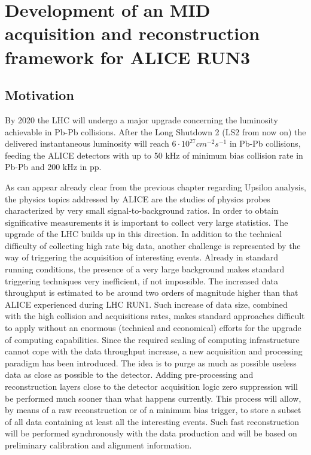 \chapter{Development of an MID acquisition and reconstruction framework for ALICE RUN3}

\section{Motivation}
By 2020 the LHC will undergo a major upgrade concerning the luminosity achievable in Pb-Pb collisions.
After the Long Shutdown 2 (LS2 from now on) the delivered instantaneous luminosity will reach $6\cdot10^{27} cm^{-2}s^{-1}$ in Pb-Pb collisions, feeding the ALICE detectors with up to 50 kHz of minimum bias collision rate in Pb-Pb and 200 kHz in pp.

As can appear already clear from the previous chapter regarding Upsilon analysis, the physics topics addressed by ALICE are the studies of physics probes characterized by very small signal-to-background ratios.
In order to obtain significative measurements it is important to collect very large statistics.
The upgrade of the LHC builds up in this direction.
In addition to the technical difficulty of collecting high rate big data, another challenge is represented by the way of triggering the acquisition of interesting events.
Already in standard running conditions, the presence of a very large background makes standard triggering techniques very inefficient, if not impossible.
The increased data throughput is estimated to be around two orders of magnitude higher than that ALICE experienced during LHC RUN1.
Such increase of data size, combined with the high collision and acquisitions rates, makes standard approaches difficult to apply without an enormous (technical and economical) efforts for the upgrade of computing capabilities.
Since the required scaling of computing infrastructure cannot cope with the data throughput increase, a new acquisition and processing paradigm has been introduced.
The idea is to purge as much as possible useless data as close as possible to the detector.
Adding pre-processing and reconstruction layers close to the detector acquisition logic zero suppression will be performed much sooner than what happens currently.
This process will allow, by means of a raw reconstruction or of a minimum bias trigger, to store a subset of all data containing at least all the interesting events.
Such fast reconstruction will be performed synchronously with the data production and will be based on preliminary calibration and alignment information.

